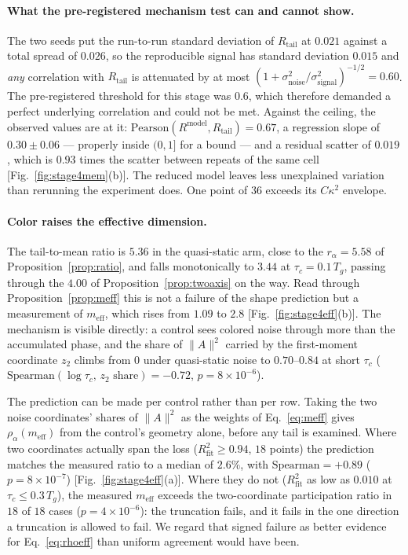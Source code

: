 \documentclass[aps,pra,twocolumn,superscriptaddress,reprint,nofootinbib,floatfix]{revtex4-2}
\theoremstyle{definition}
\newcommand{\Rt}{R_{\mathrm{tail}}}
\newcommand{\Rm}{R^{\mathrm{model}}}
\begin{document}
\paragraph*{What the pre-registered mechanism test can and cannot show.} The
two seeds put the run-to-run standard deviation of $\Rt$ at $0.021$ against a
total spread of $0.026$, so the reproducible signal has standard deviation
$0.015$ and \emph{any} correlation with $\Rt$ is attenuated by at most
$(1+\sigma^2_{\mathrm{noise}}/\sigma^2_{\mathrm{signal}})^{-1/2}=0.60$. The
pre-registered threshold for this stage was $0.6$, which therefore demanded a
perfect underlying correlation and could not be met. Against the ceiling, the
observed values are at it: $\mathrm{Pearson}(\Rm,\Rt)=0.67$, a regression
slope of $0.30\pm0.06$ --- properly inside $(0,1]$ for a bound --- and a
residual scatter of $0.019$, which is $0.93$ times the scatter between
repeats of the same cell [Fig.~\ref{fig:stage4mem}(b)]. The reduced model
leaves less unexplained variation than rerunning the experiment does. One
point of $36$ exceeds its $C\kappa^2$ envelope.

\paragraph*{Color raises the effective dimension.} The tail-to-mean ratio is
$5.36$ in the quasi-static arm, close to the $r_\alpha=5.58$ of
Proposition~\ref{prop:ratio}, and falls monotonically to $3.44$ at
$\tau_c=0.1\,T_g$, passing through the $4.00$ of
Proposition~\ref{prop:twoaxis} on the way. Read through
Proposition~\ref{prop:meff} this is not a failure of the shape prediction but
a measurement of $m_{\mathrm{eff}}$, which rises from $1.09$ to $2.8$
[Fig.~\ref{fig:stage4eff}(b)]. The mechanism is visible directly: a control
sees colored noise through more than the accumulated phase, and the share of
$\|A\|^2$ carried by the first-moment coordinate $z_2$ climbs from $0$ under
quasi-static noise to $0.70$--$0.84$ at short $\tau_c$
($\mathrm{Spearman}(\log\tau_c,\,z_2\text{ share})=-0.72$,
$p=8\times10^{-6}$).

The prediction can be made per control rather than per row. Taking the two
noise coordinates' shares of $\|A\|^2$ as the weights of
Eq.~\eqref{eq:meff} gives $\rho_\alpha(m_{\mathrm{eff}})$ from the control's
geometry alone, before any tail is examined. Where two coordinates actually
span the loss ($R^2_{\mathrm{fit}}\ge0.94$, $18$ points) the prediction
matches the measured ratio to a median of $2.6\%$, with
$\mathrm{Spearman}=+0.89$ ($p=8\times10^{-7}$)
[Fig.~\ref{fig:stage4eff}(a)]. Where they do not ($R^2_{\mathrm{fit}}$ as low
as $0.010$ at $\tau_c\le0.3\,T_g$), the measured $m_{\mathrm{eff}}$ exceeds
the two-coordinate participation ratio in $18$ of $18$ cases
($p=4\times10^{-6}$): the truncation fails, and it fails in the one direction
a truncation is allowed to fail. We regard that signed failure as better
evidence for Eq.~\eqref{eq:rhoeff} than uniform agreement would have been.
\end{document}
